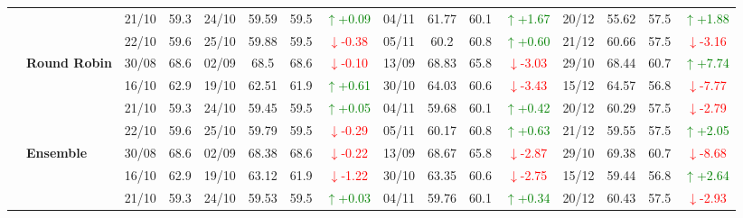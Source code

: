 {\begin{longtable}{llcc|cccc|cccc|cccc}
&
& 21/10 & 59.3 & 24/10 & 59.59 & 59.5 & \textcolor{green}{\(\uparrow\)+0.09} & 04/11 & 61.77 & 60.1 & \textcolor{green}{\(\uparrow\)+1.67} & 20/12 & 55.62 & 57.5 & \textcolor{green}{\(\uparrow\)+1.88} \\

&
& 22/10 & 59.6 & 25/10 & 59.88 & 59.5 & \textcolor{red}{\(\downarrow\)-0.38} & 05/11 & 60.2 & 60.8 & \textcolor{green}{\(\uparrow\)+0.60} & 21/12 & 60.66 & 57.5 & \textcolor{red}{\(\downarrow\)-3.16} \\
\cmidrule(lr){2-16}


& \textbf{Round Robin}
& 30/08 & 68.6 & 02/09 & 68.5 & 68.6 & \textcolor{red}{\(\downarrow\)-0.10} & 13/09 & 68.83 & 65.8 & \textcolor{red}{\(\downarrow\)-3.03} & 29/10 & 68.44 & 60.7 & \textcolor{green}{\(\uparrow\)+7.74} \\

&
& 16/10 & 62.9 & 19/10 & 62.51 & 61.9 & \textcolor{green}{\(\uparrow\)+0.61} & 30/10 & 64.03 & 60.6 & \textcolor{red}{\(\downarrow\)-3.43} & 15/12 & 64.57 & 56.8 & \textcolor{red}{\(\downarrow\)-7.77} \\

&
& 21/10 & 59.3 & 24/10 & 59.45 & 59.5 & \textcolor{green}{\(\uparrow\)+0.05} & 04/11 & 59.68 & 60.1 & \textcolor{green}{\(\uparrow\)+0.42} & 20/12 & 60.29 & 57.5 & \textcolor{red}{\(\downarrow\)-2.79} \\

&
& 22/10 & 59.6 & 25/10 & 59.79 & 59.5 & \textcolor{red}{\(\downarrow\)-0.29} & 05/11 & 60.17 & 60.8 & \textcolor{green}{\(\uparrow\)+0.63} & 21/12 & 59.55 & 57.5 & \textcolor{green}{\(\uparrow\)+2.05} \\
\cmidrule(lr){2-16}

& \textbf{Ensemble}
& 30/08 & 68.6 & 02/09 & 68.38 & 68.6 & \textcolor{red}{\(\downarrow\)-0.22} & 13/09 & 68.67 & 65.8 & \textcolor{red}{\(\downarrow\)-2.87} & 29/10 & 69.38 & 60.7 & \textcolor{red}{\(\downarrow\)-8.68} \\

&
& 16/10 & 62.9 & 19/10 & 63.12 & 61.9 & \textcolor{red}{\(\downarrow\)-1.22} & 30/10 & 63.35 & 60.6 & \textcolor{red}{\(\downarrow\)-2.75} & 15/12 & 59.44 & 56.8 & \textcolor{green}{\(\uparrow\)+2.64} \\

&
& 21/10 & 59.3 & 24/10 & 59.53 & 59.5 & \textcolor{green}{\(\uparrow\)+0.03} & 04/11 & 59.76 & 60.1 & \textcolor{green}{\(\uparrow\)+0.34} & 20/12 & 60.43 & 57.5 & \textcolor{red}{\(\downarrow\)-2.93} \\


\end{longtable}}
